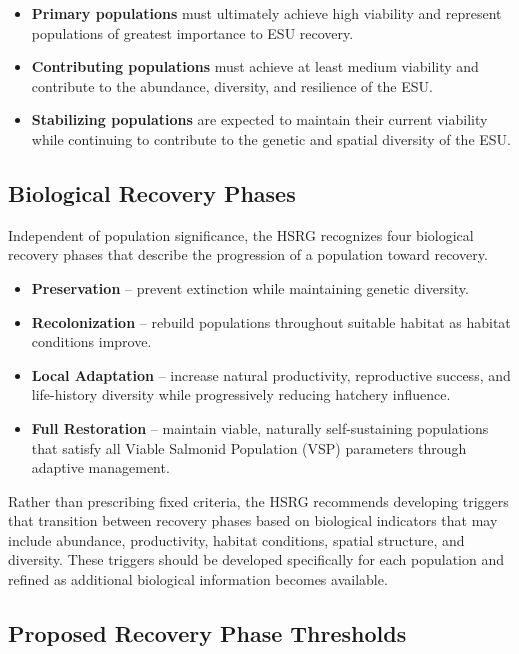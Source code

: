 \documentclass[12pt,letterpaper]{article}
\providecommand{\tightlist}{%
  \setlength{\itemsep}{0pt}\setlength{\parskip}{0pt}}
\begin{document}
\begin{itemize}
\tightlist
\item
  \textbf{Primary populations} must ultimately achieve high viability and represent populations of greatest importance to ESU recovery.
\item
  \textbf{Contributing populations} must achieve at least medium viability and contribute to the abundance, diversity, and resilience of the ESU.
\item
  \textbf{Stabilizing populations} are expected to maintain their current viability while continuing to contribute to the genetic and spatial diversity of the ESU.
\end{itemize}

\subsection{Biological Recovery Phases}\label{biological-recovery-phases}

Independent of population significance, the HSRG recognizes four biological recovery phases that describe the progression of a population toward recovery.

\begin{itemize}
\tightlist
\item
  \textbf{Preservation} -- prevent extinction while maintaining genetic diversity.
\item
  \textbf{Recolonization} -- rebuild populations throughout suitable habitat as habitat conditions improve.
\item
  \textbf{Local Adaptation} -- increase natural productivity, reproductive success, and life-history diversity while progressively reducing hatchery influence.
\item
  \textbf{Full Restoration} -- maintain viable, naturally self-sustaining populations that satisfy all Viable Salmonid Population (VSP) parameters through adaptive management.
\end{itemize}

Rather than prescribing fixed criteria, the HSRG recommends developing triggers that transition between recovery phases based on biological indicators that may include abundance, productivity, habitat conditions, spatial structure, and diversity. These triggers should be developed specifically for each population and refined as additional biological information becomes available.

\subsection{Proposed Recovery Phase Thresholds}\label{proposed-recovery-phase-thresholds}
\end{document}
